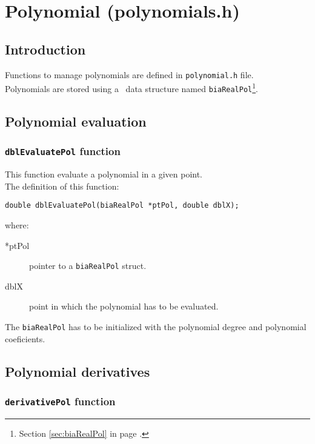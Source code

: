 %
%

\chapter{Polynomial (polynomials.h)} \label{sec:polynomial}

\section{Introduction}

Functions to manage polynomials are defined in \texttt{polynomial.h} file.\\

Polynomials are stored using a \BI\ data structure named \texttt{biaRealPol}\footnote{Section \ref{sec:biaRealPol} in page \pageref{sec:biaRealPol}.}.

\section{Polynomial evaluation}

\subsection{\texttt{dblEvaluatePol} function}

This function evaluate a polynomial in a given point.\\

The definition of this function:
%
\begin{verbatim}
double dblEvaluatePol(biaRealPol *ptPol, double dblX);  
\end{verbatim}
%
where:
\begin{description} 
\item[*ptPol] pointer to a \texttt{biaRealPol} struct.
\item[dblX] point in which the polynomial has to be evaluated.
\end{description}
%
The \texttt{biaRealPol} has to be initialized with the polynomial degree and polynomial coeficients.


\section{Polynomial derivatives}

\subsection{\texttt{derivativePol} function}

